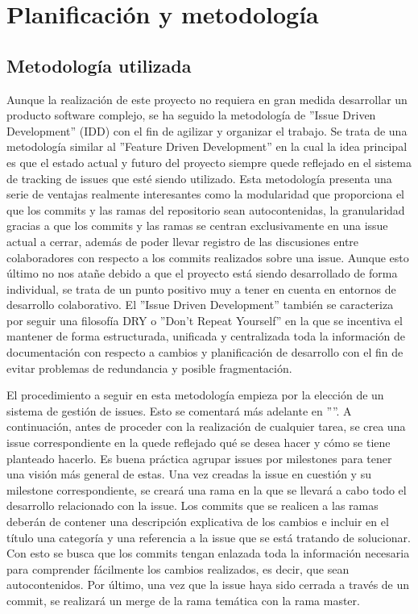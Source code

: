 \chapter{Planificación y metodología}
\label{planificacion}

\section{Metodología utilizada}
\label{metodologia}
Aunque la realización de este proyecto no requiera en gran medida desarrollar un producto software complejo, 
se ha seguido la metodología de ''Issue Driven Development'' (IDD) con el fin de agilizar y organizar el trabajo.
Se trata de una metodología similar al ''Feature Driven Development'' en la cual la idea principal es que el 
estado actual y futuro del proyecto siempre quede reflejado en el sistema de tracking de issues que esté siendo utilizado.
Esta metodología presenta una serie de ventajas realmente interesantes como la modularidad que proporciona el que 
los commits y las ramas del repositorio sean autocontenidas, la granularidad gracias a que los commits y las ramas 
se centran exclusivamente en una issue actual a cerrar, además de poder llevar registro de las discusiones entre 
colaboradores con respecto a los commits realizados sobre una issue. Aunque esto último no nos atañe debido a que 
el proyecto está siendo desarrollado de forma individual, se trata de un punto positivo muy a tener en cuenta en 
entornos de desarrollo colaborativo.
El ''Issue Driven Development'' también se caracteriza por seguir una filosofía DRY o ''Don't Repeat Yourself'' en 
la que se incentiva el mantener de forma estructurada, unificada y centralizada toda la información de documentación 
con respecto a cambios y planificación de desarrollo con el fin de evitar problemas de redundancia y posible
fragmentación.\bigskip

El procedimiento a seguir en esta metodología empieza por la elección de un sistema de gestión de issues. Esto se 
comentará más adelante en ''''. A continuación, antes de proceder con la realización de 
cualquier tarea, se crea una issue correspondiente en la quede reflejado qué se desea hacer y cómo se tiene planteado 
hacerlo. Es buena práctica agrupar issues por milestones para tener una visión más general de estas. Una vez 
creadas la issue en cuestión y su milestone correspondiente, se creará una rama en la que se llevará a cabo todo el 
desarrollo relacionado con la issue. Los commits que se realicen a las ramas deberán de contener una descripción 
explicativa de los cambios e incluir en el título una categoría y una referencia a la issue que se está tratando de solucionar. Con 
esto se busca que los commits tengan enlazada toda la información necesaria para comprender fácilmente los cambios 
realizados, es decir, que sean autocontenidos. Por último, una vez que la issue haya sido cerrada a través de un 
commit, se realizará un merge de la rama temática con la rama master.

